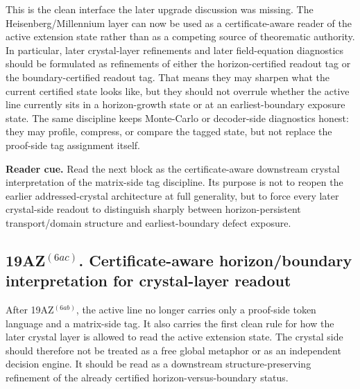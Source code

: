 \begin{remark}
\label{rem:what-this-matrix-reading-now-buys-for-later-crystal-and-field-equation-upgrades}
This is the clean interface the later upgrade discussion was missing. The Heisenberg/Millennium layer can now be used as a certificate-aware reader of the active extension state rather than as a competing source of theorematic authority. In particular, later crystal-layer refinements and later field-equation diagnostics should be formulated as refinements of either the horizon-certified readout tag or the boundary-certified readout tag. That means they may sharpen what the current certified state looks like, but they should not overrule whether the active line currently sits in a horizon-growth state or at an earliest-boundary exposure state. The same discipline keeps Monte-Carlo or decoder-side diagnostics honest: they may profile, compress, or compare the tagged state, but not replace the proof-side tag assignment itself.
\end{remark}


\noindent\textbf{Reader cue.} Read the next block as the certificate-aware downstream crystal interpretation of the matrix-side tag discipline. Its purpose is not to reopen the earlier addressed-crystal architecture at full generality, but to force every later crystal-side readout to distinguish sharply between horizon-persistent transport/domain structure and earliest-boundary defect exposure.

\subsection*{19AZ$^{(6ac)}$. Certificate-aware horizon/boundary interpretation for crystal-layer readout}
\label{sec:certificate-aware-horizon-boundary-interpretation-for-crystal-layer-readout}
After 19AZ$^{(6ab)}$, the active line no longer carries only a proof-side token language and a matrix-side tag. It also carries the first clean rule for how the later crystal layer is allowed to read the active extension state. The crystal side should therefore not be treated as a free global metaphor or as an independent decision engine. It should be read as a downstream structure-preserving refinement of the already certified horizon-versus-boundary status.

